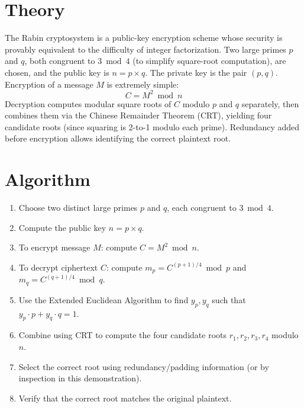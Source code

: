 \section{Theory}
The Rabin cryptosystem is a public-key encryption scheme whose security is
provably equivalent to the difficulty of integer factorization. Two large
primes $p$ and $q$, both congruent to $3 \bmod 4$ (to simplify square-root
computation), are chosen, and the public key is $n = p \times q$. The
private key is the pair $(p, q)$. Encryption of a message $M$ is extremely
simple:
\[
C = M^2 \bmod n
\]
Decryption computes modular square roots of $C$ modulo $p$ and $q$ separately,
then combines them via the Chinese Remainder Theorem (CRT), yielding four
candidate roots (since squaring is 2-to-1 modulo each prime). Redundancy
added before encryption allows identifying the correct plaintext root.

\section{Algorithm}
\begin{enumerate}
  \item Choose two distinct large primes $p$ and $q$, each congruent to $3 \bmod 4$.
  \item Compute the public key $n = p \times q$.
  \item To encrypt message $M$: compute $C = M^2 \bmod n$.
  \item To decrypt ciphertext $C$: compute $m_p = C^{(p+1)/4} \bmod p$ and $m_q = C^{(q+1)/4} \bmod q$.
  \item Use the Extended Euclidean Algorithm to find $y_p, y_q$ such that $y_p \cdot p + y_q \cdot q = 1$.
  \item Combine using CRT to compute the four candidate roots $r_1, r_2, r_3, r_4$ modulo $n$.
  \item Select the correct root using redundancy/padding information (or by inspection in this demonstration).
  \item Verify that the correct root matches the original plaintext.
\end{enumerate}

